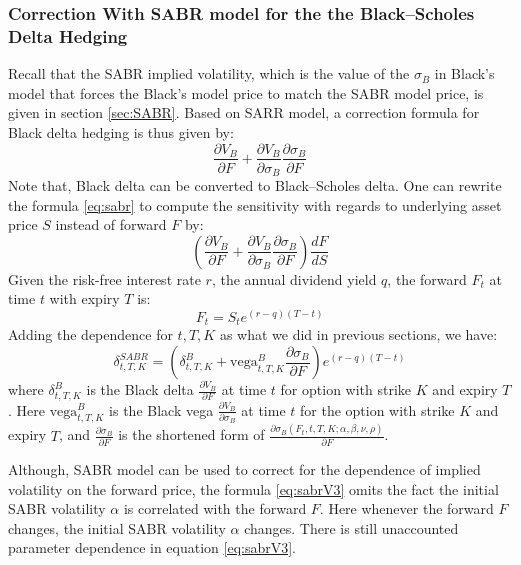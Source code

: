 \documentclass[letterpaper,12pt,titlepage,oneside,final]{book}
\numberwithin{equation}{section}
\theoremstyle{definition}
\begin{document}
\subsubsection{Correction With SABR model for the the Black–Scholes Delta Hedging}
Recall that the SABR implied volatility, which is the value of the $\sigma_B$ in Black's model that forces the Black's model price to match the SABR model price, is given in section \ref{sec:SABR}.
Based on SARR model, a correction formula for Black delta hedging is thus given by:
\begin{equation}
\frac{\partial V_{B}}{\partial F} + \frac{\partial V_{B}}{\partial \sigma_B}
\frac{\partial \sigma_B}{\partial F}
\label{eq:sabr}
\end{equation}
Note that, Black delta can be converted to Black–Scholes delta.
One can rewrite the formula \eqref{eq:sabr} to compute the sensitivity with regards to underlying asset price $S$ instead of forward $F$ by:
\begin{equation}
\left(\frac{\partial V_{B}}{\partial F} + \frac{\partial V_{B}}{\partial \sigma_B}
    \frac{\partial \sigma_B}{\partial F}\right)\frac{d F}{d S}
    \label{eq:sabrV2}
    \end{equation}
 Given the risk-free interest rate $r$, the annual dividend yield $q$, the forward $F_t$ at time $t$ with expiry $T$ is: 
\[
        F_t=S_t e^{(r-q) (T-t)}
 \]
Adding the dependence for $t,T,K$ as what we did in previous sections, we  have:
\begin{equation}
    \delta^{SABR}_{t,T,K}=\left( \delta^{B}_{t,T,K}+\text{vega}^{B}_{t,T,K} \frac{\partial \sigma_B}{\partial F} \right)e^{(r-q) (T-t)}
    \label{eq:sabrV3}
\end{equation}
where 
$\delta^{B}_{t,T,K}$ is the Black delta $\frac{\partial V_{B}}{\partial F}$ at time $t$ for option with strike $K$ and expiry $T$. Here
$\text{vega}^{B}_{t,T,K}$ is the Black vega $\frac{\partial V_{B}}{\partial \sigma_{B}}$ at time $t$ for the option with strike $K$ and expiry $T$, and 
$\frac{\partial \sigma_B}{\partial F}$ is the shortened form  of $\frac{\partial\sigma_{B}(F_t,t,T,K;\alpha,\beta,\nu,\rho)}{\partial F}$.


Although, SABR model can be used to correct for the dependence of implied volatility on the forward price, the formula \eqref{eq:sabrV3} omits the fact the initial SABR volatility $\alpha$ is correlated with the forward $F$. Here whenever the forward $F$ changes,  the initial SABR volatility $\alpha$ changes.  There is still unaccounted parameter dependence  in  equation \eqref{eq:sabrV3}.
\end{document}
